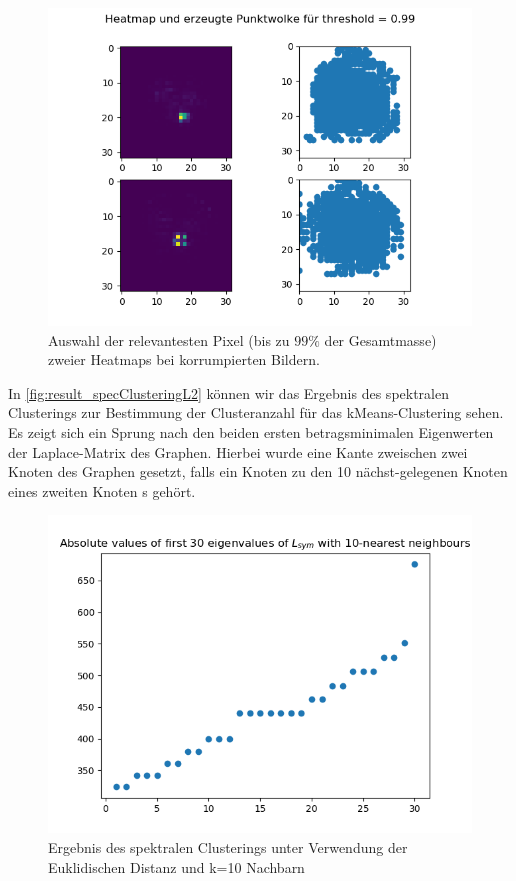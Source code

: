 \documentclass[11pt,a4paper]{article}
\numberwithin{equation}{section}
\begin{document}
	\begin{figure}[h]
		\begin{center}
			\includegraphics[width=0.5\textheight]{HeatmapPunktwolke99.png}
			\caption{Auswahl der relevantesten Pixel (bis zu $99\%$ der Gesamtmasse) zweier Heatmaps bei korrumpierten Bildern.}
		\end{center}
		\label{im:punktwolke}
	\end{figure}

	In \autoref{fig:result_specClusteringL2} können wir das Ergebnis des spektralen Clusterings zur Bestimmung der Clusteranzahl für das kMeans-Clustering sehen. Es zeigt sich ein Sprung nach den beiden ersten betragsminimalen Eigenwerten der Laplace-Matrix des Graphen. Hierbei wurde eine Kante zweischen zwei Knoten des Graphen gesetzt, falls ein Knoten zu den 10 nächst-gelegenen Knoten eines zweiten Knoten s gehört.
	
	
	\begin{figure}[h]
		\begin{center}
			\includegraphics[width=0.5\textheight]{specClustering_l2_k10.png}
			\caption{Ergebnis des spektralen Clusterings unter Verwendung der Euklidischen Distanz und k=10 Nachbarn}
			\label{fig:result_specClusteringL2}
		\end{center}
	\end{figure}
	
\end{document}
